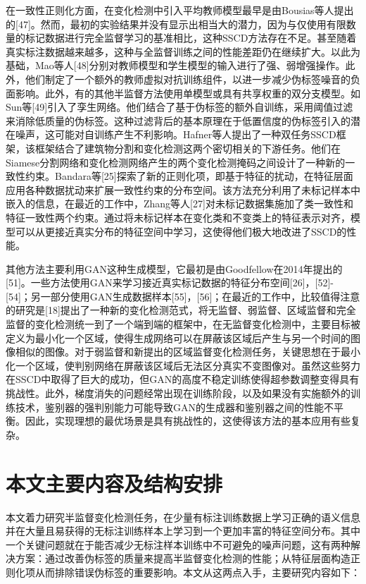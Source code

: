 \documentclass[lang=chs, degree=master, blindreview=false, adobe=false]{yanputhesis}
\begin{document}
在一致性正则化方面，在变化检测中引入平均教师模型最早是由Bousias等人提出的[47]。然而，最初的实验结果并没有显示出相当大的潜力，因为与仅使用有限数量的标记数据进行完全监督学习的基准相比，这种SSCD方法存在不足。甚至随着真实标注数据越来越多，这种与全监督训练之间的性能差距仍在继续扩大。以此为基础，Mao等人[48]分别对教师模型和学生模型的输入进行了强、弱增强操作。此外，他们制定了一个额外的教师虚拟对抗训练组件，以进一步减少伪标签噪音的负面影响。此外，有的其他半监督方法使用单模型或具有共享权重的双分支模型。如Sun等[49]引入了孪生网络。他们结合了基于伪标签的额外自训练，采用阈值过滤来消除低质量的伪标签。这种过滤背后的基本原理在于低置信度的伪标签引入的潜在噪声，这可能对自训练产生不利影响。Hafner等人提出了一种双任务SSCD框架，该框架结合了建筑物分割和变化检测这两个密切相关的下游任务。他们在Siamese分割网络和变化检测网络产生的两个变化检测掩码之间设计了一种新的一致性约束。Bandara等[25]探索了新的正则化项，即基于特征的扰动，在特征层面应用各种数据扰动来扩展一致性约束的分布空间。该方法充分利用了未标记样本中嵌入的信息，在最近的工作中，Zhang等人[27]对未标记数据集施加了类一致性和特征一致性两个约束。通过将未标记样本在变化类和不变类上的特征表示对齐，模型可以从更接近真实分布的特征空间中学习，这使得他们极大地改进了SSCD的性能。

其他方法主要利用GAN这种生成模型，它最初是由Goodfellow在2014年提出的[51]。一些方法使用GAN来学习接近真实标记数据的特征分布空间[26]，[52]- [54]；另一部分使用GAN生成数据样本[55]，[56]；在最近的工作中，比较值得注意的研究是[18]提出了一种新的变化检测范式，将无监督、弱监督、区域监督和完全监督的变化检测统一到了一个端到端的框架中，在无监督变化检测中，主要目标被定义为最小化一个区域，使得生成网络可以在屏蔽该区域后产生与另一个时间的图像相似的图像。对于弱监督和新提出的区域监督变化检测任务，关键思想在于最小化一个区域，使判别网络在屏蔽该区域后无法区分真实不变图像对。虽然这些努力在SSCD中取得了巨大的成功，但GAN的高度不稳定训练使得超参数调整变得具有挑战性。此外，梯度消失的问题经常出现在训练阶段，以及如果没有实施额外的训练技术，鉴别器的强判别能力可能导致GAN的生成器和鉴别器之间的性能不平衡。因此，实现理想的最优场景是具有挑战性的，这使得该方法的基本应用有些复杂。

\section{本文主要内容及结构安排}
本文着力研究半监督变化检测任务，在少量有标注训练数据上学习正确的语义信息并在大量且易获得的无标注训练样本上学习到一个更加丰富的特征空间分布。其中一个关键问题就在于能否减少无标注样本训练中不可避免的噪声问题，这有两种解决方案：通过改善伪标签的质量来提高半监督变化检测的性能；从特征层面构造正则化项从而排除错误伪标签的重要影响。本文从这两点入手，主要研究内容如下：
\end{document}
